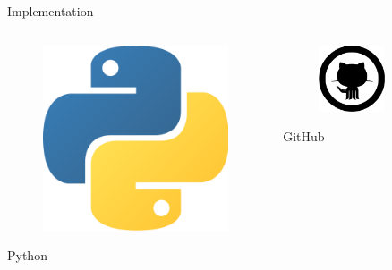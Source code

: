 \documentclass{beamer}
\begin{document}
  \begin{frame}{Implementation}
    \begin{columns}[b]
      \begin{column}{.3\textwidth}
        \centering
          \begin{figure}
            \includegraphics[width=.6\textwidth]{img/python.png}
          \end{figure}
          {\large Python}
      \end{column}
      \begin{column}{.3\textwidth}
        \centering
          \begin{figure}
            \includegraphics[width=.6\textwidth]{img/github.png}
          \end{figure}
          {\large GitHub}
      \end{column}
      \begin{column}{.3\textwidth}
        \centering
          \begin{figure}

\end{figure}
\end{column}
\end{columns}
\end{frame}
\end{document}
